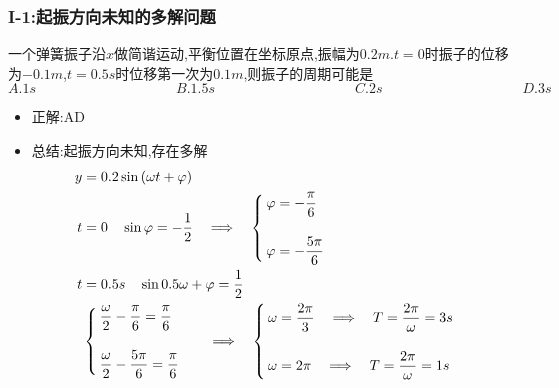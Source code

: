 \documentclass{article}
\begin{document}
\subsubsection{I-1:起振方向未知的多解问题}
一个弹簧振子沿$x$做简谐运动,平衡位置在坐标原点,振幅为$0.2m$.$t= 0$时振子的位移为$-0.1m$,$t = 0.5s$时位移第一次为$0.1m$,则振子的周期可能是
$$
    A. 1s   \hspace{10em}    B. 1.5s      \hspace{10em}    C. 2s      \hspace{10em}    D. 3s
$$

\begin{itemize}
    \item 正解:\quad AD
    \item 总结:\quad 起振方向未知,存在多解
          \begin{align*}
              y & = 0.2\sin{(\omega t + \varphi)}                            \\
              t & = 0  \quad  \sin{\varphi} = -\dfrac{1}{2} \quad \Longrightarrow \quad
              \begin{cases}
                  \varphi = - \dfrac{\pi}{6} \\
                  \,                         \\
                  \varphi = - \dfrac{5\pi}{6}
              \end{cases}                                     \\
              t & = 0.5s \quad \sin{0.5 \omega  + \varphi } = \dfrac{1}{2}   \\
                & \begin{cases}
                      \dfrac{\omega}{2} - \dfrac{\pi}{6} = \dfrac{\pi}{6} \\
                      \,                                                  \\
                      \dfrac{\omega}{2} - \dfrac{5\pi}{6} = \dfrac{\pi}{6}
                  \end{cases}
              \quad \Longrightarrow  \quad
              \begin{cases}
                  \omega = \dfrac{2\pi}{3} \quad \Longrightarrow \quad T = \dfrac{2\pi}{\omega} = 3s \\
                  \,                                                                      \\
                  \omega = 2\pi \quad \Longrightarrow \quad T = \dfrac{2\pi}{\omega} = 1s
              \end{cases}
          \end{align*}


\end{itemize}
\end{document}
